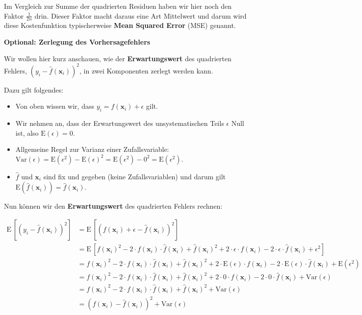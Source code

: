 \documentclass[
]{book}
\providecommand{\tightlist}{%
  \setlength{\itemsep}{0pt}\setlength{\parskip}{0pt}}
\begin{document}
Im Vergleich zur Summe der quadrierten Residuen haben wir hier noch den Faktor \(\frac{1}{2n}\) drin. Dieser Faktor macht daraus eine Art Mittelwert und darum wird diese Kostenfunktion typischerweise \textbf{Mean Squared Error} (MSE) genannt.

\textbf{Optional: Zerlegung des Vorhersagefehlers}

Wir wollen hier kurz anschauen, wie der \textbf{Erwartungswert} des quadrierten Fehlers, \(\left(y_i - \hat{f}(\mathbf{x}_i)\right)^2\), in zwei Komponenten zerlegt werden kann.

Dazu gilt folgendes:

\begin{itemize}
\tightlist
\item
  Von oben wissen wir, dass \(y_i = f(\mathbf{x}_i) + \epsilon\) gilt.
\item
  Wir nehmen an, dass der Erwartungswert des unsystematischen Teils \(\epsilon\) Null ist, also \(\text{E}(\epsilon)=0\).
\item
  Allgemeine Regel zur Varianz einer Zufallsvariable: \(\text{Var}(\epsilon) = \text{E}(\epsilon^2) - \text{E}(\epsilon)^2 = \text{E}(\epsilon^2) - 0^2 = \text{E}(\epsilon^2)\).
\item
  \(\hat{f}\) und \(\mathbf{x}_i\) sind fix und gegeben (keine Zufallsvariablen) und darum gilt \(\text{E}\left(\hat{f}(\mathbf{x}_i)\right)=\hat{f}(\mathbf{x}_i)\).
\end{itemize}

Nun können wir den \textbf{Erwartungswert} des quadrierten Fehlers rechnen:

\begin{align}
\text{E}\,\left[\left(y_i - \hat{f}(\mathbf{x}_i)\right)^2\right] &= \text{E}\,\left[\left(f(\mathbf{x}_i) + \epsilon - \hat{f}(\mathbf{x}_i)\right)^2\right] \\
&= \text{E}\,\left[f(\mathbf{x}_i)^2 - 2 \cdot f(\mathbf{x}_i) \cdot \hat{f}(\mathbf{x}_i) + \hat{f}(\mathbf{x}_i)^2 + 2 \cdot \epsilon \cdot f(\mathbf{x}_i) - 2 \cdot \epsilon \cdot \hat{f}(\mathbf{x}_i) + \epsilon^2 \right] \\
&= f(\mathbf{x}_i)^2 - 2 \cdot f(\mathbf{x}_i) \cdot \hat{f}(\mathbf{x}_i) + \hat{f}(\mathbf{x}_i)^2 + 2 \cdot \text{E}(\epsilon) \cdot f(\mathbf{x}_i) - 2 \cdot \text{E}(\epsilon) \cdot \hat{f}(\mathbf{x}_i) + \text{E}(\epsilon^2) \\
&= f(\mathbf{x}_i)^2 - 2 \cdot f(\mathbf{x}_i) \cdot \hat{f}(\mathbf{x}_i) + \hat{f}(\mathbf{x}_i)^2 + 2 \cdot 0 \cdot f(\mathbf{x}_i) - 2 \cdot 0 \cdot \hat{f}(\mathbf{x}_i) + \text{Var}(\epsilon) \\
&= f(\mathbf{x}_i)^2 - 2 \cdot f(\mathbf{x}_i) \cdot \hat{f}(\mathbf{x}_i) + \hat{f}(\mathbf{x}_i)^2 + \text{Var}(\epsilon) \\
&= \left(f(\mathbf{x}_i) - \hat{f}(\mathbf{x}_i)\right)^2 + \text{Var}(\epsilon)
\end{align}
\end{document}
